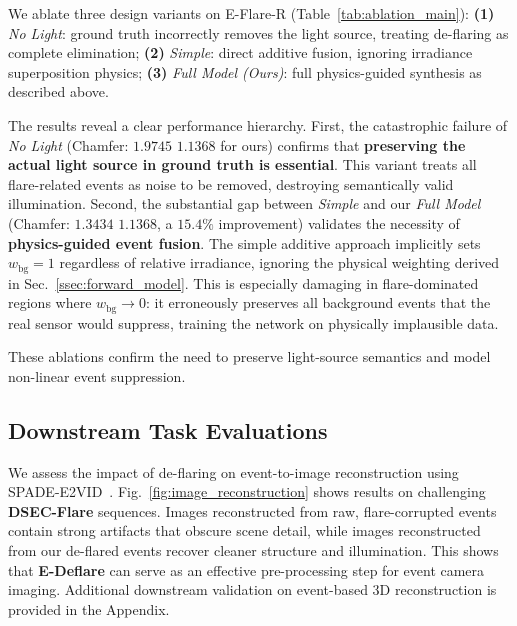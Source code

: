 We ablate three design variants on E-Flare-R (Table~\ref{tab:ablation_main}):
\textbf{(1)} \emph{No Light}: ground truth incorrectly removes the light source, treating de-flaring as complete elimination;
\textbf{(2)} \emph{Simple}: direct additive fusion, ignoring irradiance superposition physics;
\textbf{(3)} \emph{Full Model (Ours)}: full physics-guided synthesis as described above.

The results reveal a clear performance hierarchy.
First, the catastrophic failure of \emph{No Light} (Chamfer: $1.9745$ \vs $1.1368$ for ours) confirms that \textbf{preserving the actual light source in ground truth is essential}. This variant treats all flare-related events as noise to be removed, destroying semantically valid illumination.
Second, the substantial gap between \emph{Simple} and our \emph{Full Model} (Chamfer: $1.3434$ \vs $1.1368$, a $15.4\%$ improvement) validates the necessity of \textbf{physics-guided event fusion}. The simple additive approach implicitly sets $w_{\mathrm{bg}} = 1$ regardless of relative irradiance, ignoring the physical weighting derived in Sec.~\ref{ssec:forward_model}. This is especially damaging in flare-dominated regions where $w_{\mathrm{bg}} \to 0$: it erroneously preserves all background events that the real sensor would suppress, training the network on physically implausible data.

These ablations confirm the need to preserve light-source semantics and model non-linear event suppression.


\subsection{Downstream Task Evaluations}
\label{sec:downstream}

We assess the impact of de-flaring on event-to-image reconstruction using SPADE-E2VID~\cite{cadena2021spade}. Fig.~\ref{fig:image_reconstruction} shows results on challenging \textbf{DSEC-Flare} sequences. Images reconstructed from raw, flare-corrupted events contain strong artifacts that obscure scene detail, while images reconstructed from our de-flared events recover cleaner structure and illumination. This shows that \textbf{E-Deflare} can serve as an effective pre-processing step for event camera imaging. Additional downstream validation on event-based 3D reconstruction is provided in the Appendix.

